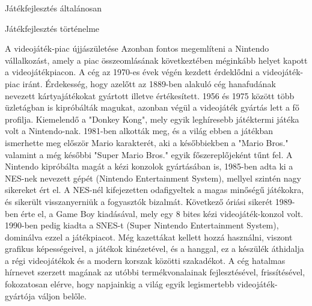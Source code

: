 \begin{MyChapter}{Játékfejlesztés általánosan}
\begin{MySection}{Játékfejlesztés történelme}
		\begin{MySubSection}{A videojáték-piac újjászületése}
			Azonban fontos megemlíteni a Nintendo vállalkozást, amely a piac összeomlásának következtében méginkább helyet kapott a videojátékpiacon. A cég az 1970-es évek végén kezdett érdeklődni a videojáték-piac iránt. Érdekesség, hogy azelőtt az 1889-ben alakuló cég hanafudának nevezett kártyajátékokat gyártott illetve értékesített. 1956 és 1975 között több üzletágban is kipróbálták magukat, azonban végül a videojáték gyártás lett a fő profilja. Kiemelendő a "Donkey Kong", mely egyik leghíresebb játéktermi játéka volt a Nintendo-nak. 1981-ben alkották meg, és a világ ebben a játékban ismerhette meg először Mario karakterét, aki a későbbiekben a "Mario Bros." valamint a még későbbi "Super Mario Bros." egyik főszereplőjeként tűnt fel. A Nintendo kipróbálta magát a kézi konzolok gyártásában is, 1985-ben adta ki a NES-nek nevezett gépét (Nintendo Entertainment System), mellyel szintén nagy sikereket ért el. A NES-nél kifejezetten odafigyeltek a magas minőségű játékokra, és sikerült visszanyerniük a fogyasztók bizalmát. Következő óriási sikerét 1989-ben érte el, a Game Boy kiadásával, mely egy 8 bites kézi videojáték-konzol volt. 1990-ben pedig kiadta a SNES-t (Super Nintendo Entertainment System), dominálva ezzel a játékpiacot. Még kazettákat kellett hozzá használni, viszont grafikus képességeivel, a játékok kinézetével, és a hanggal, ez a készülék áthidalja a régi videojátékok és a modern korszak közötti szakadékot. A cég hatalmas hírnevet szerzett magának az utóbbi termékvonalainak fejlesztésével, frissítésével, fokozatosan elérve, hogy napjainkig a világ egyik legismertebb videojáték-gyártója váljon belőle.
			\cite{nintendo}
			\cite{game_boy}
			
			
		

\end{MySubSection}
\end{MySection}
\end{MyChapter}
